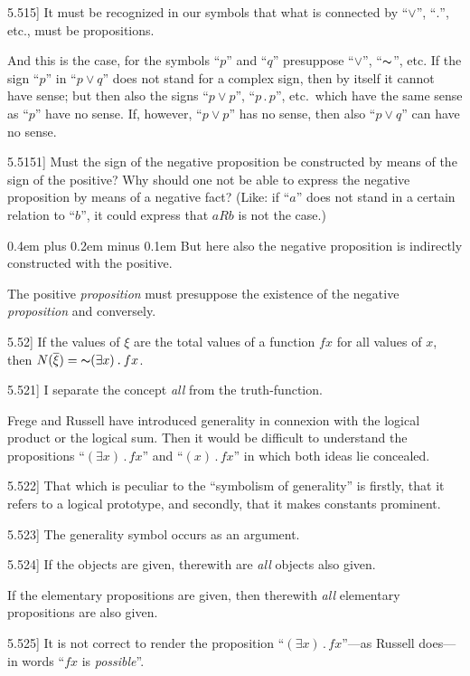 \documentclass[12pt,oneside]{book}[2007/10/19]
\newcommand{\PropositionE}[2]{%
  \item[\phantomsection\label{PropE:#1}\PropGRef{#1}] #2%
}
\newcommand{\PropGRef}[1]{\hyperref[PropG:#1]{#1}}
\newcommand{\Not}[1]{\mathord{\thicksim} #1}
\newcommand{\DotOp}{\mathbin{.}}
\newcommand{\stretchyspace}{\spaceskip0.4em plus 0.2em minus 0.1em}
\begin{document}
\begin{propositions}
\PropositionE{5.515}
{It must be recognized in our symbols that what
is connected by ``$\lor$'', ``$\DotOp$'', etc., must be propositions.

And this is the case, for the symbols ``$p$'' and
``$q$'' presuppose ``$\lor$'', ``$\Not{}$'', etc. If the sign
``$p$'' in ``$p \lor q$'' does not stand for a complex sign,
then by itself it cannot have sense; but then also
the signs ``$p \lor p$'', ``$p \DotOp p$'', etc.\ which have the
same sense as ``$p$'' have no sense. If, however,
``$p \lor p$'' has no sense, then also ``$p \lor q$'' can have
no sense.}


\PropositionE{5.5151}
{Must the sign of the negative proposition be
constructed by means of the sign of the positive?
Why should one not be able to express the
negative proposition by means of a negative fact?
(Like: if ``$a$'' does not stand in a certain relation
to ``$b$'', it could express that $aRb$ is not the case.)

{\stretchyspace
But here also the negative proposition is indirectly
constructed with the positive.}

The positive \emph{proposition} must presuppose the
existence of the negative \emph{proposition} and conversely.}


\PropositionE{5.52}
{If the values of $\xi$ are the total values of a function
$fx$ for all values of $x$, then $N(\overline{\xi}) = \Not{(\exists x) \DotOp fx}$.}


\PropositionE{5.521}
{I separate the concept \emph{all} from the truth-function.

Frege and Russell have introduced generality
in connexion with the logical product or the logical
sum. Then it would be difficult to understand
the propositions ``$(\exists x) \DotOp fx$'' and ``$(x) \DotOp fx$'' in which
both ideas lie concealed.}


\PropositionE{5.522}
{That which is peculiar to the ``symbolism of
generality'' is firstly, that it refers to a logical
prototype, and secondly, that it makes constants
prominent.}


\PropositionE{5.523}
{The generality symbol occurs as an argument.}


\PropositionE{5.524}
{If the objects are given, therewith are \emph{all} objects
also given.

If the elementary propositions are given, then
therewith \emph{all} elementary propositions are also
given.}


\PropositionE{5.525}
{It is not correct to render the proposition
\enlargethispage{9pt} %
``$(\exists x) \DotOp fx$''---as Russell does---in words ``$fx$ is
\emph{possible}''.

}
\end{propositions}
\end{document}
